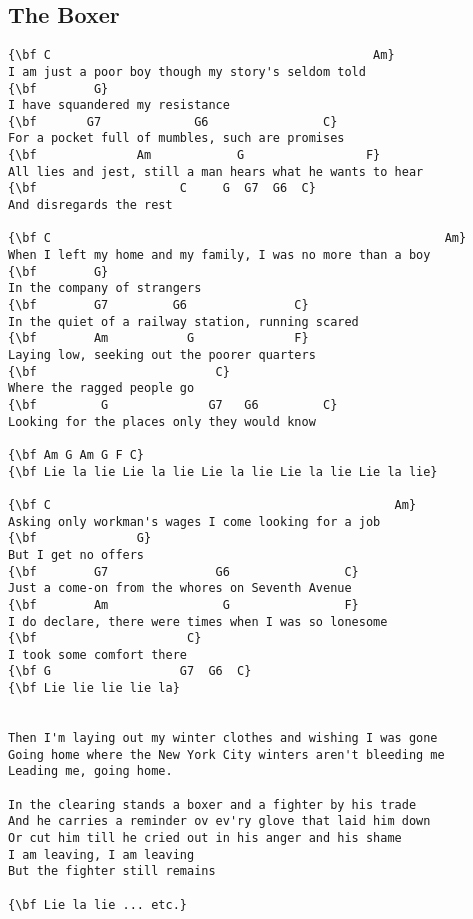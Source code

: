 \documentclass[a4paper]{article}
\begin{document}
\subsection{The Boxer} %
\label{sub:The Boxer}
\begin{Verbatim}[commandchars=\\\{\}]
{\bf C                                             Am}
I am just a poor boy though my story's seldom told
{\bf        G}
I have squandered my resistance
{\bf       G7             G6                C}
For a pocket full of mumbles, such are promises
{\bf              Am            G                 F}
All lies and jest, still a man hears what he wants to hear
{\bf                    C     G  G7  G6  C}
And disregards the rest

{\bf C                                                       Am}
When I left my home and my family, I was no more than a boy
{\bf        G}
In the company of strangers
{\bf        G7         G6               C}
In the quiet of a railway station, running scared
{\bf        Am           G              F}
Laying low, seeking out the poorer quarters
{\bf                         C}
Where the ragged people go
{\bf         G              G7   G6         C}
Looking for the places only they would know

{\bf Am G Am G F C}
{\bf Lie la lie Lie la lie Lie la lie Lie la lie Lie la lie}

{\bf C                                                Am}
Asking only workman's wages I come looking for a job
{\bf              G}
But I get no offers
{\bf        G7               G6                C}
Just a come-on from the whores on Seventh Avenue
{\bf        Am                G                F}
I do declare, there were times when I was so lonesome
{\bf                     C}
I took some comfort there
{\bf G                  G7  G6  C}
{\bf Lie lie lie lie la}


Then I'm laying out my winter clothes and wishing I was gone
Going home where the New York City winters aren't bleeding me
Leading me, going home.

In the clearing stands a boxer and a fighter by his trade
And he carries a reminder ov ev'ry glove that laid him down
Or cut him till he cried out in his anger and his shame
I am leaving, I am leaving
But the fighter still remains

{\bf Lie la lie ... etc.}

\end{Verbatim}
\newpage
\end{document}
